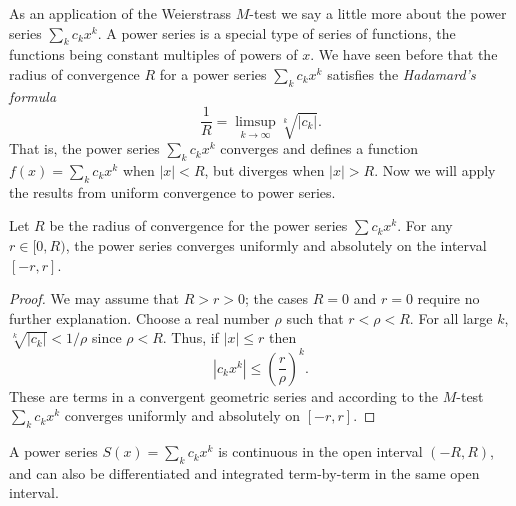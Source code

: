 \documentclass[11pt]{article}
\begin{document}
\medskip
As an application of the Weierstrass $M$-test we say a little more about the power series $\sum_k c_k x^k$.
A power series is a special type of series of functions, the functions being constant multiples of powers of $x$.
We have seen before that the radius of convergence $R$ for a power series $\sum_k c_k x^k$ satisfies the \textit{Hadamard's formula}
\[
  \frac{1}{R} = \limsup_{k \to \infty} \sqrt[k]{|c_k|}.
\]
That is, the power series $\sum_k c_k x^k$ converges and defines a function $f(x) = \sum_k c_k x^k$ when $|x| < R$, but diverges when $|x| > R$.
Now we will apply the results from uniform convergence to power series.

\begin{thm}
  \label{thm:power-series-R-unif}
  Let $R$ be the radius of convergence for the power series $\sum c_k x^k$.
  For any $r \in [0,R)$, the power series converges uniformly and absolutely on the interval $[-r,r]$.
\end{thm}

\begin{proof}
  We may assume that $R > r > 0$; the cases $R = 0$ and $r = 0$ require no further explanation.
  Choose a real number $\rho$ such that $r < \rho < R$.
  For all large $k$, $\sqrt[k]{|c_k|} < 1/\rho$ since $\rho < R$.
  Thus, if $|x| \leqslant r$ then
  \[
    |c_k x^k| \leqslant \left( \frac{r}{\rho} \right)^k.
  \]
  These are terms in a convergent geometric series and according to the $M$-test $\sum_k c_k x^k$ converges uniformly and absolutely on $[-r,r]$.
\end{proof}

\begin{cor}
  \label{cor:power-series}
  A power series $S(x) = \sum_k c_k x^k$ is continuous in the open interval $(-R, R)$, and can also be differentiated and integrated term-by-term in the same open interval.
\end{cor}
\end{document}
